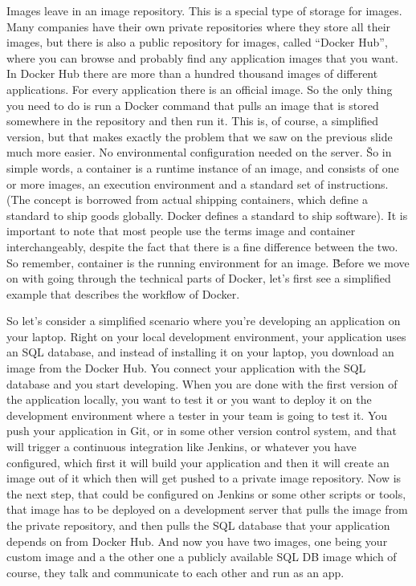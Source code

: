 Images leave in an image repository. This is a special type of storage for images. Many companies have their own
private repositories where they store all their images, but there is also a public repository for images, called
``Docker Hub'', where you can browse and probably find any application images that you want. In Docker Hub there are
more than a hundred thousand images of different applications. For every application there is an official image. So
the only thing you need to do is run a Docker command that pulls an image that is stored somewhere in the repository
and then run it. This is, of course, a simplified version, but that makes exactly the problem that we saw on the
previous slide much more easier. No environmental configuration needed on the server. \v

So in simple words, a container is a runtime instance of an image, and consists of one or more images, an execution
environment and a standard set of instructions. (The concept is borrowed from actual shipping containers, which
define a standard to ship goods globally. Docker defines a standard to ship software). It is important to note that
most people use the terms image and container interchangeably, despite the fact that there is a fine difference
between the two. So remember, container is the running environment for an image. \v

Before we move on with going through the technical parts of Docker, let's first see a simplified example that
describes the workflow of Docker.

\be
So let's consider a simplified scenario where you're developing an application on your laptop. Right on your local
development environment, your application uses an SQL database, and instead of installing it on your laptop, you
download an image from the Docker Hub. You connect your application with the SQL database and you start developing.
When you are done with the first version of the application locally, you want to test it or you want to deploy it on
the development environment where a tester in your team is going to test it. You push your application in Git, or in
some other version control system, and that will trigger a continuous integration like Jenkins, or whatever you have
configured, which first it will build your application and then it will create an image out of it which then will get
pushed to a private image repository. Now is the next step, that could be configured on Jenkins or some other scripts
or tools, that image has to be deployed on a development server that pulls the image from the private repository, and
then pulls the SQL database that your application depends on from Docker Hub. And now you have two images, one being
your custom image and a the other one a publicly available SQL DB image which of course, they talk and communicate to
each other and run as an app.

